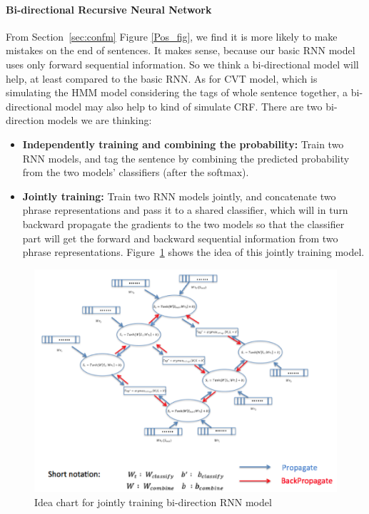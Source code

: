\documentclass[11pt]{article}
\begin{document}
\paragraph{Bi-directional Recursive Neural Network}
From Section~\ref{sec:confm} Figure \ref{Pos_fig}, we find it is more likely to make mistakes on the end of sentences. It makes sense, because our basic RNN model uses only forward sequential information. So we think a bi-directional model will help, at least compared to the basic RNN. As for CVT model, which is simulating the HMM model considering the tags of whole sentence together, a bi-directional model may also help to kind of simulate CRF. There are two bi-direction models we are thinking:
\begin{itemize}
\item \textbf{Independently training and combining the probability: } Train two RNN models, and tag the sentence by combining the predicted probability from the two models' classifiers (after the softmax). 
\item \textbf{Jointly training: } Train two RNN models jointly, and concatenate two phrase representations and pass it to a shared classifier, which will in turn backward propagate the gradients to the two models so that the classifier part will get the forward and backward sequential information from two phrase representations. Figure~\ref{fig:bi-direc} shows the idea of this jointly training model.
\end{itemize}
\begin{figure}
\includegraphics[scale=0.5]{bi_direct.png}
\caption{Idea chart for jointly training bi-direction RNN model}\label{fig:bi-direc}
\end{figure}
\end{document}

